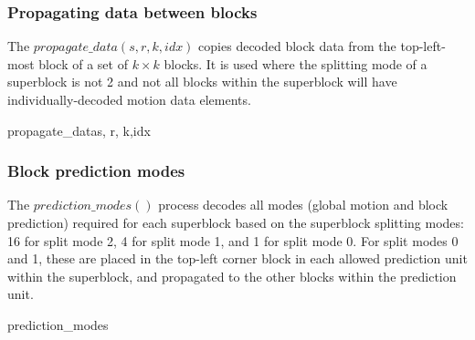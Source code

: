 \subsubsection{Propagating data between blocks}
\label{propagatedata}

The $propagate\_data(s, r, k,idx)$ copies decoded block data from the top-left-most block
of a set of $k\times k$ blocks. It is used where the splitting mode of a superblock is not 2 and not all
blocks within the superblock will have individually-decoded motion data elements.

\begin{pseudo}{propagate\_data}{s, r, k,idx}
        \bsCODE{\BlockData[j][i][idx]=\BlockData[s][r][idx]}
    \bsEND
\bsEND
\end{pseudo}

\subsubsection{Block prediction modes}
\label{blockpredmodes}

The $prediction\_modes()$ process decodes all modes (global motion and block prediction) 
required for each superblock based on
the superblock splitting modes: 16 for split mode 2, 4 for split mode 1, and 1 for split mode 0. For split
modes 0 and 1, these are placed in the top-left corner block in each allowed prediction unit within the
superblock, and propagated to the other blocks within the prediction unit.

\begin{pseudo}{prediction\_modes}{}
           \bsEND
        \bsEND
    \bsEND
\bsEND
{}
\end{pseudo}

